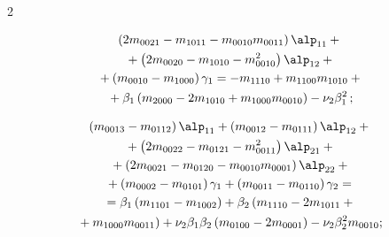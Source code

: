\begin{multicols}{2}
{    \noindent

    \begin{multline*}

   \left(2m_{0021}-m_{1011}-m_{0010}m_{0011}\right)\alp_{11} + {}\\

   {}+\left(2m_{0020}-m_{1010}-m_{0010}^2\right)\alp_{12}+{}\\

{}+ \left(m_{0010}-m_{1000}\right)\gamma_1 =- m_{1110}+m_{1100}m_{1010}+{}\\

{}+ \beta_1 \left(m_{2000}- 2m_{1010}+m_{1000}m_{0010}\right)-\nu_2\beta_1^2\,;


\end{multline*}



 \vspace*{-10pt}



    \noindent

    \begin{multline*}

   \left(m_{0013}-m_{0112}\right)\alp_{11} + \left( m_{0012}-m_{0111}\right)\alp_{12} +{}\\

   {}+\left(2m_{0022}-m_{0121}-m_{0011}^2\right) \alp_{21}+{}\\

{}+ \left(2m_{0021}-m_{0120}-m_{0010}m_{0001}\right)\alp_{22} +{}\\

{}+\left(m_{0002}-m_{0101}\right)\gamma_1+ \left(m_{0011}-m_{0110}\right)\gamma_2 ={}\\

{}=\beta_1

\left(m_{1101}-m_{1002}\right) +\beta_2 \left(m_{1110}-2 m_{1011}+{}\right.\\

\!\left.{}+m_{1000}m_{0011}\right)+ \nu_2 \beta_1\beta_2 \left(m_{0100}-2m_{0001}\right)-\nu_2\beta_2^2 m_{0010};


\end{multline*}



 \vspace*{-10pt}



    \noindent

}
\end{multicols}
